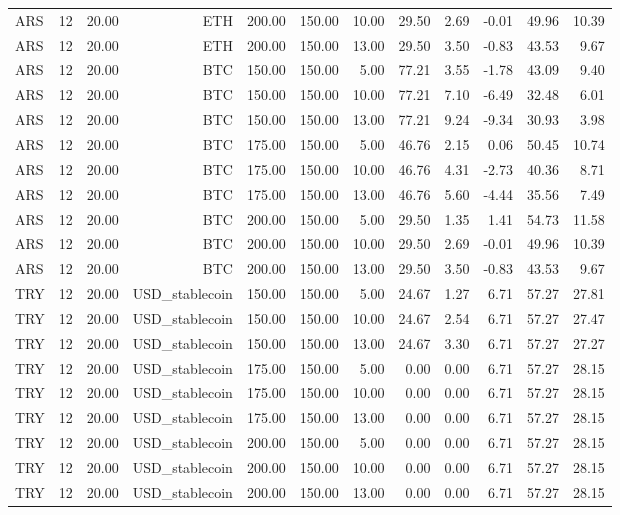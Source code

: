\begin{tabular}{lrrrrrrrrrrr}
ARS & 12 & 20.00 & ETH & 200.00 & 150.00 & 10.00 & 29.50 & 2.69 & -0.01 & 49.96 & 10.39 \\
ARS & 12 & 20.00 & ETH & 200.00 & 150.00 & 13.00 & 29.50 & 3.50 & -0.83 & 43.53 & 9.67 \\
ARS & 12 & 20.00 & BTC & 150.00 & 150.00 & 5.00 & 77.21 & 3.55 & -1.78 & 43.09 & 9.40 \\
ARS & 12 & 20.00 & BTC & 150.00 & 150.00 & 10.00 & 77.21 & 7.10 & -6.49 & 32.48 & 6.01 \\
ARS & 12 & 20.00 & BTC & 150.00 & 150.00 & 13.00 & 77.21 & 9.24 & -9.34 & 30.93 & 3.98 \\
ARS & 12 & 20.00 & BTC & 175.00 & 150.00 & 5.00 & 46.76 & 2.15 & 0.06 & 50.45 & 10.74 \\
ARS & 12 & 20.00 & BTC & 175.00 & 150.00 & 10.00 & 46.76 & 4.31 & -2.73 & 40.36 & 8.71 \\
ARS & 12 & 20.00 & BTC & 175.00 & 150.00 & 13.00 & 46.76 & 5.60 & -4.44 & 35.56 & 7.49 \\
ARS & 12 & 20.00 & BTC & 200.00 & 150.00 & 5.00 & 29.50 & 1.35 & 1.41 & 54.73 & 11.58 \\
ARS & 12 & 20.00 & BTC & 200.00 & 150.00 & 10.00 & 29.50 & 2.69 & -0.01 & 49.96 & 10.39 \\
ARS & 12 & 20.00 & BTC & 200.00 & 150.00 & 13.00 & 29.50 & 3.50 & -0.83 & 43.53 & 9.67 \\
TRY & 12 & 20.00 & USD\_stablecoin & 150.00 & 150.00 & 5.00 & 24.67 & 1.27 & 6.71 & 57.27 & 27.81 \\
TRY & 12 & 20.00 & USD\_stablecoin & 150.00 & 150.00 & 10.00 & 24.67 & 2.54 & 6.71 & 57.27 & 27.47 \\
TRY & 12 & 20.00 & USD\_stablecoin & 150.00 & 150.00 & 13.00 & 24.67 & 3.30 & 6.71 & 57.27 & 27.27 \\
TRY & 12 & 20.00 & USD\_stablecoin & 175.00 & 150.00 & 5.00 & 0.00 & 0.00 & 6.71 & 57.27 & 28.15 \\
TRY & 12 & 20.00 & USD\_stablecoin & 175.00 & 150.00 & 10.00 & 0.00 & 0.00 & 6.71 & 57.27 & 28.15 \\
TRY & 12 & 20.00 & USD\_stablecoin & 175.00 & 150.00 & 13.00 & 0.00 & 0.00 & 6.71 & 57.27 & 28.15 \\
TRY & 12 & 20.00 & USD\_stablecoin & 200.00 & 150.00 & 5.00 & 0.00 & 0.00 & 6.71 & 57.27 & 28.15 \\
TRY & 12 & 20.00 & USD\_stablecoin & 200.00 & 150.00 & 10.00 & 0.00 & 0.00 & 6.71 & 57.27 & 28.15 \\
TRY & 12 & 20.00 & USD\_stablecoin & 200.00 & 150.00 & 13.00 & 0.00 & 0.00 & 6.71 & 57.27 & 28.15 \\

\end{tabular}
